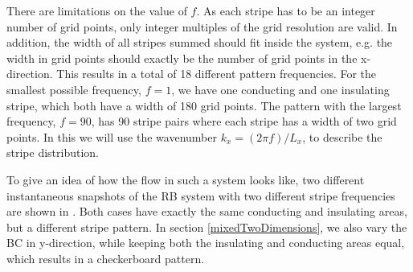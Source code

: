 There are limitations on the value of $f$. As each stripe has to be an integer
number of grid points, only integer multiples of the grid resolution are
valid. In addition, the width of all stripes summed should fit inside the
system, e.g. the width in grid points should exactly be the number of grid
points in the x-direction. This results in a total of 18 different pattern
frequencies. For the smallest possible frequency, $f=1$, we have one
conducting and one insulating stripe, which both have a width of 180 grid
points. The pattern with the largest frequency, $f=90$, has 90 stripe pairs
where each stripe has a width of two grid points. In this \docname we will use
the wavenumber $k_x = \left( 2 \pi f \right) / L_x$, to describe the stripe
distribution.

To give an idea of how the flow in such a system looks like, two different
instantaneous snapshots of the RB system with two different stripe frequencies
are shown in . Both cases have exactly the same conducting
and insulating areas, but a different stripe pattern. In section
\ref{mixedTwoDimensions}, we also vary the BC in y-direction, while keeping
both the insulating and conducting areas equal, which results in a
checkerboard pattern.

